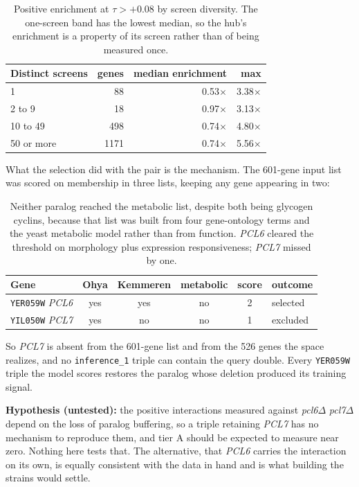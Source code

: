 \begin{table}[H]
\centering
\begin{tabular}{lrrr}
\toprule
Distinct screens & genes & median enrichment & max \\
\midrule
1      & 88    & 0.53$\times$ & 3.38$\times$ \\
2 to 9 & 18    & 0.97$\times$ & 3.13$\times$ \\
10 to 49 & 498 & 0.74$\times$ & 4.80$\times$ \\
50 or more & 1171 & 0.74$\times$ & 5.56$\times$ \\
\bottomrule
\end{tabular}
\caption{Positive enrichment at $\tau > +0.08$ by screen diversity. The
one-screen band has the lowest median, so the hub's enrichment is a property of
its screen rather than of being measured once.}
\end{table}

What the selection did with the pair is the mechanism. The 601-gene input list
was scored on membership in three lists, keeping any gene appearing in two:

\begin{table}[H]
\centering
\begin{tabular}{lccccl}
\toprule
Gene & Ohya & Kemmeren & metabolic & score & outcome \\
\midrule
\texttt{YER059W} \emph{PCL6} & yes & yes & no & 2 & selected \\
\texttt{YIL050W} \emph{PCL7} & yes & no  & no & 1 & excluded \\
\bottomrule
\end{tabular}
\caption{Neither paralog reached the metabolic list, despite both being glycogen
cyclins, because that list was built from four gene-ontology terms and the yeast
metabolic model rather than from function. \emph{PCL6} cleared the threshold on
morphology plus expression responsiveness; \emph{PCL7} missed by one.}
\end{table}

So \emph{PCL7} is absent from the 601-gene list and from the 526 genes the space
realizes, and no \texttt{inference\_1} triple can contain the query double. Every
\texttt{YER059W} triple the model scores restores the paralog whose deletion
produced its training signal.

\textbf{Hypothesis (untested):} the positive interactions measured against
\emph{pcl6}$\Delta$ \emph{pcl7}$\Delta$ depend on the loss of paralog buffering,
so a triple retaining \emph{PCL7} has no mechanism to reproduce them, and tier A
should be expected to measure near zero. Nothing here tests that. The
alternative, that \emph{PCL6} carries the interaction on its own, is equally
consistent with the data in hand and is what building the strains would settle.

